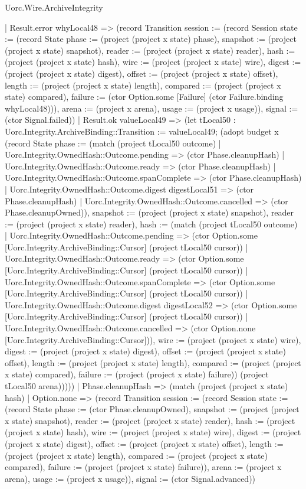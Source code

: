 \begin{lexlean}{Uorc.Wire.ArchiveIntegrity}
\begin{semanticmodule}
{        | Result.error whyLocal48 => (record Transition {session := (record Session {state := (record State {phase := (project (project x state) phase), snapshot := (project (project x state) snapshot), reader := (project (project x state) reader), hash := (project (project x state) hash), wire := (project (project x state) wire), digest := (project (project x state) digest), offset := (project (project x state) offset), length := (project (project x state) length), compared := (project (project x state) compared), failure := (ctor Option.some [Failure] (ctor Failure.binding whyLocal48))}), arena := (project x arena), usage := (project x usage)}), signal := (ctor Signal.failed)})
        | Result.ok valueLocal49 => (let tLocal50 : Uorc.Integrity.ArchiveBinding::Transition := valueLocal49; (adopt budget x (record State {phase := (match (project tLocal50 outcome)
          | Uorc.Integrity.OwnedHash::Outcome.pending => (ctor Phase.cleanupHash)
          | Uorc.Integrity.OwnedHash::Outcome.ready => (ctor Phase.cleanupHash)
          | Uorc.Integrity.OwnedHash::Outcome.spanComplete => (ctor Phase.cleanupHash)
          | Uorc.Integrity.OwnedHash::Outcome.digest digestLocal51 => (ctor Phase.cleanupHash)
          | Uorc.Integrity.OwnedHash::Outcome.cancelled => (ctor Phase.cleanupOwned)), snapshot := (project (project x state) snapshot), reader := (project (project x state) reader), hash := (match (project tLocal50 outcome)
          | Uorc.Integrity.OwnedHash::Outcome.pending => (ctor Option.some [Uorc.Integrity.ArchiveBinding::Cursor] (project tLocal50 cursor))
          | Uorc.Integrity.OwnedHash::Outcome.ready => (ctor Option.some [Uorc.Integrity.ArchiveBinding::Cursor] (project tLocal50 cursor))
          | Uorc.Integrity.OwnedHash::Outcome.spanComplete => (ctor Option.some [Uorc.Integrity.ArchiveBinding::Cursor] (project tLocal50 cursor))
          | Uorc.Integrity.OwnedHash::Outcome.digest digestLocal52 => (ctor Option.some [Uorc.Integrity.ArchiveBinding::Cursor] (project tLocal50 cursor))
          | Uorc.Integrity.OwnedHash::Outcome.cancelled => (ctor Option.none [Uorc.Integrity.ArchiveBinding::Cursor])), wire := (project (project x state) wire), digest := (project (project x state) digest), offset := (project (project x state) offset), length := (project (project x state) length), compared := (project (project x state) compared), failure := (project (project x state) failure)}) (project tLocal50 arena)))))
    | Phase.cleanupHash => (match (project (project x state) hash)
      | Option.none => (record Transition {session := (record Session {state := (record State {phase := (ctor Phase.cleanupOwned), snapshot := (project (project x state) snapshot), reader := (project (project x state) reader), hash := (project (project x state) hash), wire := (project (project x state) wire), digest := (project (project x state) digest), offset := (project (project x state) offset), length := (project (project x state) length), compared := (project (project x state) compared), failure := (project (project x state) failure)}), arena := (project x arena), usage := (project x usage)}), signal := (ctor Signal.advanced)})
}
\end{semanticmodule}
\end{lexlean}
